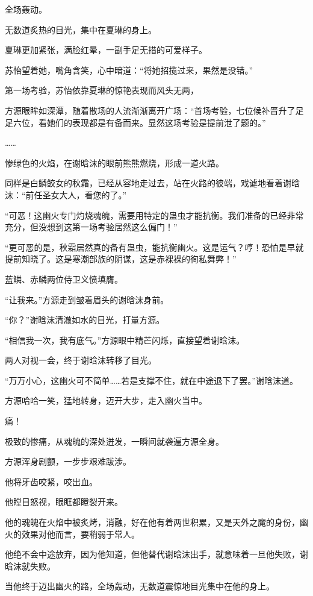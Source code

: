 \begin{this_body}
全场轰动。

无数道炙热的目光，集中在夏琳的身上。

夏琳更加紧张，满脸红晕，一副手足无措的可爱样子。

苏怡望着她，嘴角含笑，心中暗道：“将她招揽过来，果然是没错。”

第一场考验，苏怡依靠夏琳的惊艳表现而风头无两，

方源眼眸如深潭，随着散场的人流渐渐离开广场：“首场考验，七位候补晋升了足足六位，看她们的表现都是有备而来。显然这场考验是提前泄了题的。”

……

惨绿色的火焰，在谢晗沫的眼前熊熊燃烧，形成一道火路。

同样是白鳞鲛女的秋霜，已经从容地走过去，站在火路的彼端，戏谑地看着谢晗沫：“前任圣女大人，看您的了。”

“可恶！这幽火专门灼烧魂魄，需要用特定的蛊虫才能抗衡。我们准备的已经非常充分，但没想到这第一场考验居然这么偏门！”

“更可恶的是，秋霜居然真的备有蛊虫，能抗衡幽火。这是运气？哼！恐怕是早就提前知晓了。这是寒潮部族的阴谋，这是赤裸裸的徇私舞弊！”

蓝鳞、赤鳞两位侍卫义愤填膺。

“让我来。”方源走到皱着眉头的谢晗沫身前。

“你？”谢晗沫清澈如水的目光，打量方源。

“相信我一次，我有底气。”方源眼中精芒闪烁，直接望着谢晗沫。

两人对视一会，终于谢晗沫转移了目光。

“万万小心，这幽火可不简单……若是支撑不住，就在中途退下了罢。”谢晗沫道。

方源哈哈一笑，猛地转身，迈开大步，走入幽火当中。

痛！

极致的惨痛，从魂魄的深处迸发，一瞬间就袭遍方源全身。

方源浑身剧颤，一步步艰难跋涉。

他将牙齿咬紧，咬出血。

他瞠目怒视，眼眶都瞪裂开来。

他的魂魄在火焰中被炙烤，消融，好在他有着两世积累，又是天外之魔的身份，幽火的效果对他而言，要稍弱于常人。

他绝不会中途放弃，因为他知道，但他替代谢晗沫出手，就意味着一旦他失败，谢晗沫就失败。

当他终于迈出幽火的路，全场轰动，无数道震惊地目光集中在他的身上。


\end{this_body}
